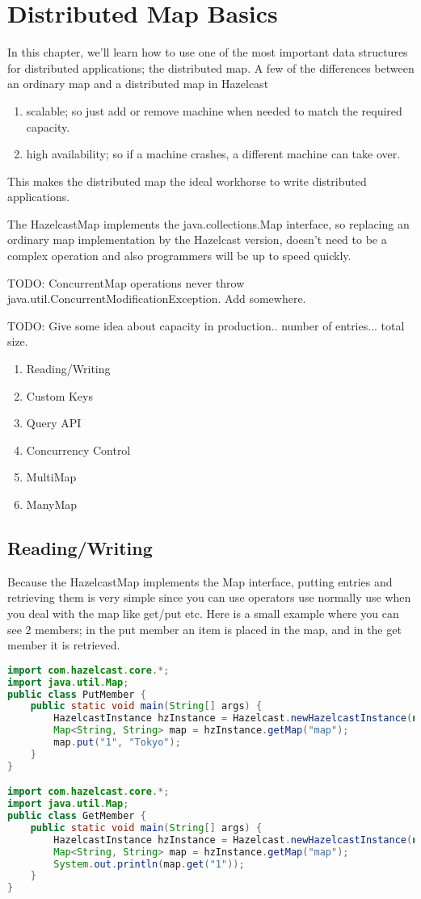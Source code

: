 \chapter{Distributed Map Basics}

In this chapter, we'll learn how to use one of the most important data structures for distributed applications; the distributed map. A few of the differences between an ordinary map and a distributed map in Hazelcast
\begin{enumerate}
\item scalable; so just add or remove machine when needed to match the required capacity.
\item high availability; so if a machine crashes, a different machine can take over. 
\end{enumerate}
This makes the distributed map the ideal workhorse to write distributed applications.

The HazelcastMap implements the java.collections.Map interface, so replacing an ordinary map implementation by the Hazelcast version, doesn't need to be a complex operation and also programmers will be up to speed quickly.

TODO: ConcurrentMap operations never throw java.util.ConcurrentModificationException. Add somewhere.

TODO: Give some idea about capacity in production.. number of entries... total size.

\begin{enumerate}
\item Reading/Writing
\item Custom Keys
\item Query API
\item Concurrency Control
\item MultiMap
\item ManyMap
\end{enumerate}

\section{Reading/Writing}
Because the HazelcastMap implements the Map interface, putting entries and retrieving them is very simple since you can use operators use normally use when you deal with the map like get/put etc. Here is a small example where you can see 2 members; in the put member an item is placed in the map, and in the get member it is retrieved.

\begin{lstlisting}[language=java]
import com.hazelcast.core.*;
import java.util.Map;
public class PutMember {
    public static void main(String[] args) {
        HazelcastInstance hzInstance = Hazelcast.newHazelcastInstance(null);
        Map<String, String> map = hzInstance.getMap("map");
        map.put("1", "Tokyo");
    }
}

import com.hazelcast.core.*;
import java.util.Map;
public class GetMember {
    public static void main(String[] args) {
        HazelcastInstance hzInstance = Hazelcast.newHazelcastInstance(null);
        Map<String, String> map = hzInstance.getMap("map");
        System.out.println(map.get("1"));
    }
}
\end{lstlisting}

